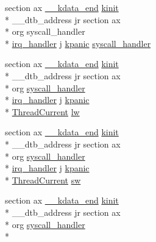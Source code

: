 \begin{DoxyCompactItemize}
section ax \hyperlink{kmemory_8c_a869ed24619b20d01d0f6c457c069ec96}{\-\_\-\-\_\-kdata\-\_\-end} \hyperlink{kinit_8c_a7316311400d5b710f1b974a353b10d1c}{kinit} \\*
\-\_\-\-\_\-dtb\-\_\-address jr section ax \\*
org syscall\-\_\-handler \\*
\hyperlink{mips_2entry_8S_a9d2aa3bc4e44a8ffda50e5b21ab6fb59}{irq\-\_\-handler} j \hyperlink{kpanic_8h_af2300a4e16ba31370a9ae2920be551d5}{kpanic} \hyperlink{mips_2entry_8S_a37916740c132fd7bd4e7a87888d28df0}{syscall\-\_\-handler}
\item 
section ax \hyperlink{kmemory_8c_a869ed24619b20d01d0f6c457c069ec96}{\-\_\-\-\_\-kdata\-\_\-end} \hyperlink{kinit_8c_a7316311400d5b710f1b974a353b10d1c}{kinit} \\*
\-\_\-\-\_\-dtb\-\_\-address jr section ax \\*
org \hyperlink{mips_2entry_8S_a37916740c132fd7bd4e7a87888d28df0}{syscall\-\_\-handler} \\*
\hyperlink{mips_2entry_8S_a9d2aa3bc4e44a8ffda50e5b21ab6fb59}{irq\-\_\-handler} j \hyperlink{kpanic_8h_af2300a4e16ba31370a9ae2920be551d5}{kpanic} \\*
\hyperlink{kthread_8h_a1da5431310f6068f6d1113c402eff5f8}{Thread\-Current} \hyperlink{mips_2entry_8S_a470726200bc61516f5c1638535329434}{lw}
\item 
section ax \hyperlink{kmemory_8c_a869ed24619b20d01d0f6c457c069ec96}{\-\_\-\-\_\-kdata\-\_\-end} \hyperlink{kinit_8c_a7316311400d5b710f1b974a353b10d1c}{kinit} \\*
\-\_\-\-\_\-dtb\-\_\-address jr section ax \\*
org \hyperlink{mips_2entry_8S_a37916740c132fd7bd4e7a87888d28df0}{syscall\-\_\-handler} \\*
\hyperlink{mips_2entry_8S_a9d2aa3bc4e44a8ffda50e5b21ab6fb59}{irq\-\_\-handler} j \hyperlink{kpanic_8h_af2300a4e16ba31370a9ae2920be551d5}{kpanic} \\*
\hyperlink{kthread_8h_a1da5431310f6068f6d1113c402eff5f8}{Thread\-Current} \hyperlink{mips_2entry_8S_a50257344f74ff9744ffcbbcac96a8f4c}{sw}
\item 
section ax \hyperlink{kmemory_8c_a869ed24619b20d01d0f6c457c069ec96}{\-\_\-\-\_\-kdata\-\_\-end} \hyperlink{kinit_8c_a7316311400d5b710f1b974a353b10d1c}{kinit} \\*
\-\_\-\-\_\-dtb\-\_\-address jr section ax \\*
org \hyperlink{mips_2entry_8S_a37916740c132fd7bd4e7a87888d28df0}{syscall\-\_\-handler} \\*

\end{DoxyCompactItemize}
